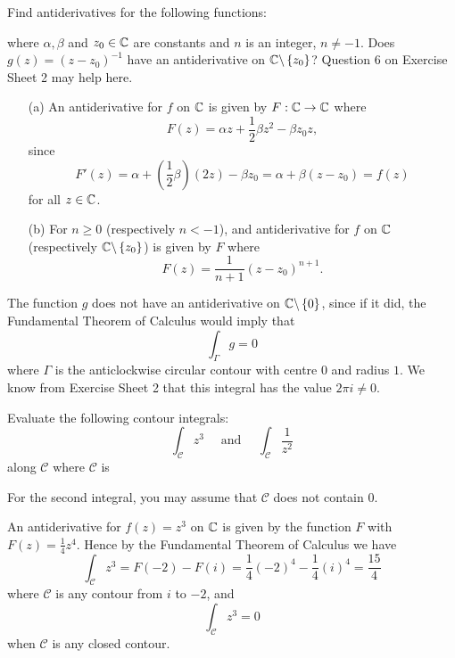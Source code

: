 

\begin{questions}
\question Find antiderivatives for the following functions:
where $\alpha,\beta$ and $z_0 \in \mathbb{C}$ are constants and $n$ is an integer, $n \neq -1$.  Does $g(z)=(z-z_0)^{-1}$ have an antiderivative on $\mathbb{C} \backslash \left\{z_0\right\}$?  Question 6 on Exercise Sheet 2 may help here.  
\begin{answer}
\begin{enumerate}
\item[(a)] An antiderivative for $f$ on $\mathbb{C}$ is given by $F:\mathbb{C} \to \mathbb{C}$ where
\[
F(z) = \alpha z + \frac{1}{2} \beta z^2 - \beta z_0 z,
\]
since
\[
F'(z) = \alpha + ( \frac{1}{2} \beta ) (2z) - \beta z_0 = \alpha + \beta(z-z_0) = f(z)
\]
for all $z \in \mathbb{C}$.
\item[(b)] For $n \geq 0$ (respectively $n<-1$), and antiderivative for $f$ on $\mathbb{C}$ (respectively $\mathbb{C} \backslash \left\{z_0\right\}$) is given by $F$ where
\[
F(z) = \frac{1}{n+1} (z-z_0)^{n+1}.
\]
\end{enumerate}
The function $g$ does not have an antiderivative on $\mathbb{C} \backslash \left\{0\right\}$, since if it did, the Fundamental Theorem of Calculus would imply that
\[
\int_{\Gamma} g = 0
\]
where $\Gamma$ is the anticlockwise circular contour with centre $0$ and radius $1$.  We know from Exercise Sheet 2 that this integral has the value $2\pi i \neq 0$.
\end{answer}
\question Evaluate the following contour integrals:
\[
\int_{\mathcal{C}} z^3 \quad \text{ and } \quad \int_{\mathcal{C}} \frac{1}{z^2}
\]
along $\mathcal{C}$ where $\mathcal{C}$ is
For the second integral, you may assume that $\mathcal{C}$ does not contain $0$.
\begin{answer}
An antiderivative for $f(z) = z^3$ on $\mathbb{C}$ is given by the function $F$ with $F(z) = \frac{1}{4} z^4$.  Hence by the Fundamental Theorem of Calculus we have
\[
\int_{\mathcal{C}} z^3 = F(-2) - F(i) = \frac{1}{4} (-2)^4-\frac{1}{4} (i)^4 = \frac{15}{4}
\]
where $\mathcal{C}$ is any contour from $i$ to $-2$, and 
\[
\int_{\mathcal{C}} z^3 = 0
\]
when $\mathcal{C}$ is any closed contour.


\end{answer}
\end{questions}
